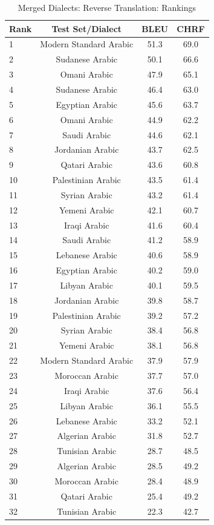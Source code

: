 \begin{table}[htbp]
\centering
\caption{Merged Dialects: Reverse Translation: Rankings}
\label{tab:testset_ranking_reverse_merged}
\begin{tabular}{l@{\hspace{3pt}}c@{\hspace{3pt}}c@{\hspace{3pt}}c}
\toprule
Rank & Test Set/Dialect & BLEU & CHRF \\
\midrule
1 & Modern Standard Arabic  & 51.3 & 69.0 \\
2 & Sudanese Arabic  & 50.1 & 66.6 \\
3 & Omani Arabic  & 47.9 & 65.1 \\
4 & Sudanese Arabic & 46.4 & 63.0 \\
5 & Egyptian Arabic  & 45.6 & 63.7 \\
6 & Omani Arabic & 44.9 & 62.2 \\
7 & Saudi Arabic  & 44.6 & 62.1 \\
8 & Jordanian Arabic  & 43.7 & 62.5 \\
9 & Qatari Arabic  & 43.6 & 60.8 \\
10 & Palestinian Arabic  & 43.5 & 61.4 \\
11 & Syrian Arabic  & 43.2 & 61.4 \\
12 & Yemeni Arabic  & 42.1 & 60.7 \\
13 & Iraqi Arabic  & 41.6 & 60.4 \\
14 & Saudi Arabic & 41.2 & 58.9 \\
15 & Lebanese Arabic  & 40.6 & 58.9 \\
16 & Egyptian Arabic & 40.2 & 59.0 \\
17 & Libyan Arabic  & 40.1 & 59.5 \\
18 & Jordanian Arabic & 39.8 & 58.7 \\
19 & Palestinian Arabic & 39.2 & 57.2 \\
20 & Syrian Arabic & 38.4 & 56.8 \\
21 & Yemeni Arabic & 38.1 & 56.8 \\
22 & Modern Standard Arabic & 37.9 & 57.9 \\
23 & Moroccan Arabic  & 37.7 & 57.0 \\
24 & Iraqi Arabic & 37.6 & 56.4 \\
25 & Libyan Arabic & 36.1 & 55.5 \\
26 & Lebanese Arabic & 33.2 & 52.1 \\
27 & Algerian Arabic  & 31.8 & 52.7 \\
28 & Tunisian Arabic  & 28.7 & 48.5 \\
29 & Algerian Arabic & 28.5 & 49.2 \\
30 & Moroccan Arabic & 28.4 & 48.9 \\
31 & Qatari Arabic & 25.4 & 49.2 \\
32 & Tunisian Arabic & 22.3 & 42.7 \\
\bottomrule
\end{tabular}
\end{table}